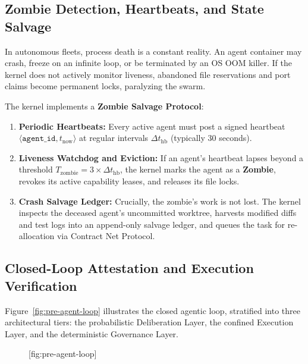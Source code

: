 \documentclass[11pt,a4paper]{article}
\begin{document}
\subsection{Zombie Detection, Heartbeats, and State Salvage}

In autonomous fleets, process death is a constant reality. An agent container may crash, freeze on an infinite loop, or be terminated by an OS OOM killer. If the kernel does not actively monitor liveness, abandoned file reservations and port claims become permanent locks, paralyzing the swarm.

The kernel implements a \textbf{Zombie Salvage Protocol}:
\begin{enumerate}[leftmargin=1.8em,itemsep=2pt]
  \item \textbf{Periodic Heartbeats:} Every active agent must post a signed heartbeat $\langle\mathtt{agent\_id}, t_{\text{now}}\rangle$ at regular intervals $\Delta t_{\text{hb}}$ (typically 30 seconds).
  \item \textbf{Liveness Watchdog and Eviction:} If an agent's heartbeat lapses beyond a threshold $T_{\text{zombie}} = 3 \times \Delta t_{\text{hb}}$, the kernel marks the agent as a \textbf{Zombie}, revokes its active capability leases, and releases its file locks.
  \item \textbf{Crash Salvage Ledger:} Crucially, the zombie's work is not lost. The kernel inspects the deceased agent's uncommitted worktree, harvests modified diffs and test logs into an append-only salvage ledger, and queues the task for re-allocation via Contract Net Protocol.
\end{enumerate}

\subsection{Closed-Loop Attestation and Execution Verification}

Figure~\ref{fig:pre-agent-loop} illustrates the closed agentic loop, stratified into three architectural tiers: the probabilistic Deliberation Layer, the confined Execution Layer, and the deterministic Governance Layer.

\begin{figure}[tp]
  \centering
  [fig:pre-agent-loop]
\end{figure}
\end{document}
